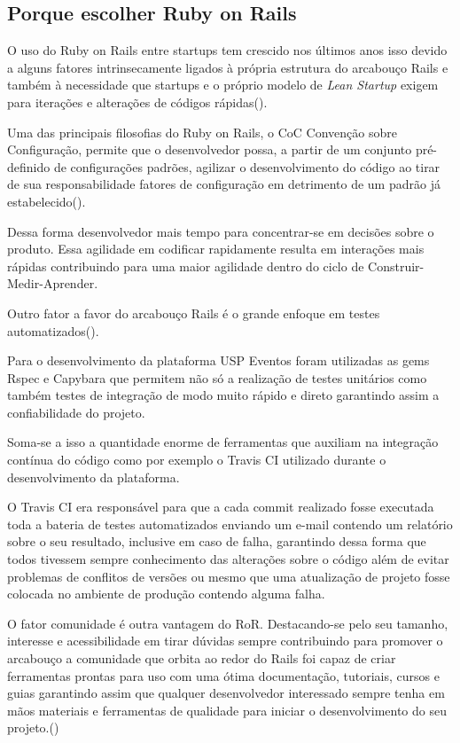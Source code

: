 \subsection{Porque escolher Ruby on Rails }
\par O uso do Ruby on Rails entre startups tem crescido nos últimos anos isso devido a alguns fatores intrinsecamente ligados à própria estrutura do arcabouço Rails e também à necessidade que startups e o próprio modelo de \emph{Lean Startup} exigem para iterações e alterações de códigos rápidas(\cite{lilia:16}).
\par Uma das principais filosofias do Ruby on Rails, o CoC \- Convenção sobre Configuração, permite que o desenvolvedor possa, a partir de um conjunto pré-definido de configurações padrões, agilizar o desenvolvimento do código ao tirar de sua responsabilidade fatores de configuração em detrimento de um padrão já estabelecido(\cite{morrice:15}).
\par Dessa forma desenvolvedor mais tempo para concentrar-se em decisões sobre o produto. Essa agilidade em codificar rapidamente resulta em interações mais rápidas contribuindo para uma maior agilidade dentro do ciclo de Construir-Medir-Aprender.
\par Outro fator a favor do arcabouço Rails é o grande enfoque em testes automatizados(\cite{morrice:15}).
\par Para o desenvolvimento da plataforma USP Eventos foram utilizadas as gems Rspec e Capybara que permitem não só a realização de testes unitários como também testes de integração de modo muito rápido e direto garantindo assim a confiabilidade do projeto.
\par Soma-se a isso a quantidade enorme de ferramentas que auxiliam na integração contínua do código como por exemplo o Travis CI utilizado durante o desenvolvimento da plataforma.
\par O Travis CI era responsável para que a cada commit realizado fosse executada toda a bateria de testes automatizados enviando um e-mail contendo um relatório sobre o seu resultado, inclusive em caso de falha, garantindo dessa forma que todos tivessem sempre conhecimento das alterações sobre o código além de evitar problemas de conflitos de versões ou mesmo que uma atualização de projeto fosse colocada no ambiente de produção contendo alguma falha.
\par O fator comunidade é outra vantagem do RoR. Destacando-se pelo seu tamanho, interesse e acessibilidade em tirar dúvidas sempre contribuindo para promover o arcabouço a comunidade que orbita ao redor do Rails foi capaz de criar ferramentas prontas para uso com uma ótima documentação, tutoriais, cursos e guias garantindo assim que qualquer desenvolvedor interessado sempre tenha em mãos materiais e ferramentas de qualidade para iniciar o desenvolvimento do seu projeto.(\cite{lilia:16})
